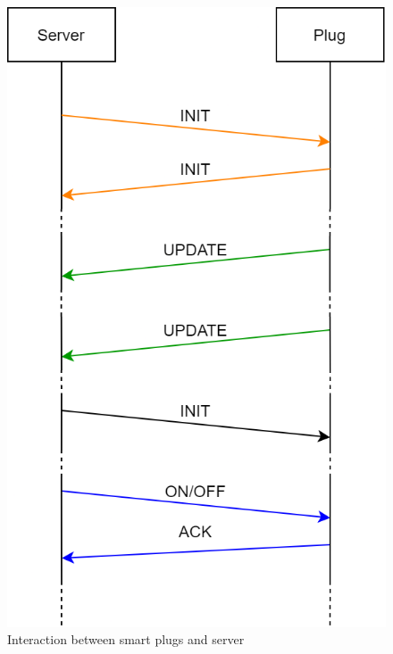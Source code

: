 \documentclass[conference]{IEEEtran}
\begin{document}
	\begin{figure}[htbp]
		\centering
		\includegraphics[width=\linewidth]{assets/plugserverinteraction}
		\caption{Interaction between smart plugs and server}
		\label{fig:plugserverinteraction}
	\end{figure}
	
\end{document}
